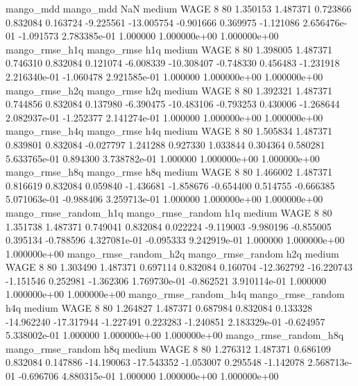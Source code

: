             mango_mdd         mango_mdd                  NaN     medium     WAGE                 8 80  1.350153       1.487371 0.723866       0.832084    0.163724     -9.225561    -13.005754    -0.901666       0.369975 -1.121086 2.656476e-01    -1.091573   2.783385e-01            1.000000    1.000000e+00        1.000000e+00
       mango_rmse_h1q        mango_rmse                  h1q     medium     WAGE                 8 80  1.398005       1.487371 0.746310       0.832084    0.121074     -6.008339    -10.308407    -0.748330       0.456483 -1.231918 2.216340e-01    -1.060478   2.921585e-01            1.000000    1.000000e+00        1.000000e+00
       mango_rmse_h2q        mango_rmse                  h2q     medium     WAGE                 8 80  1.392321       1.487371 0.744856       0.832084    0.137980     -6.390475    -10.483106    -0.793253       0.430006 -1.268644 2.082937e-01    -1.252377   2.141274e-01            1.000000    1.000000e+00        1.000000e+00
       mango_rmse_h4q        mango_rmse                  h4q     medium     WAGE                 8 80  1.505834       1.487371 0.839801       0.832084   -0.027797      1.241288      0.927330     1.033844       0.304364  0.580281 5.633765e-01     0.894300   3.738782e-01            1.000000    1.000000e+00        1.000000e+00
       mango_rmse_h8q        mango_rmse                  h8q     medium     WAGE                 8 80  1.466002       1.487371 0.816619       0.832084    0.059840     -1.436681     -1.858676    -0.654400       0.514755 -0.666385 5.071063e-01    -0.988406   3.259713e-01            1.000000    1.000000e+00        1.000000e+00
mango_rmse_random_h1q mango_rmse_random                  h1q     medium     WAGE                 8 80  1.351738       1.487371 0.749041       0.832084    0.022224     -9.119003     -9.980196    -0.855005       0.395134 -0.788596 4.327081e-01    -0.095333   9.242919e-01            1.000000    1.000000e+00        1.000000e+00
mango_rmse_random_h2q mango_rmse_random                  h2q     medium     WAGE                 8 80  1.303490       1.487371 0.697114       0.832084    0.160704    -12.362792    -16.220743    -1.151546       0.252981 -1.362306 1.769730e-01    -0.862521   3.910114e-01            1.000000    1.000000e+00        1.000000e+00
mango_rmse_random_h4q mango_rmse_random                  h4q     medium     WAGE                 8 80  1.264827       1.487371 0.687984       0.832084    0.133328    -14.962240    -17.317944    -1.227491       0.223283 -1.240851 2.183329e-01    -0.624957   5.338002e-01            1.000000    1.000000e+00        1.000000e+00
mango_rmse_random_h8q mango_rmse_random                  h8q     medium     WAGE                 8 80  1.276312       1.487371 0.686109       0.832084    0.147886    -14.190063    -17.543352    -1.053007       0.295548 -1.142078 2.568713e-01    -0.696706   4.880315e-01            1.000000    1.000000e+00        1.000000e+00